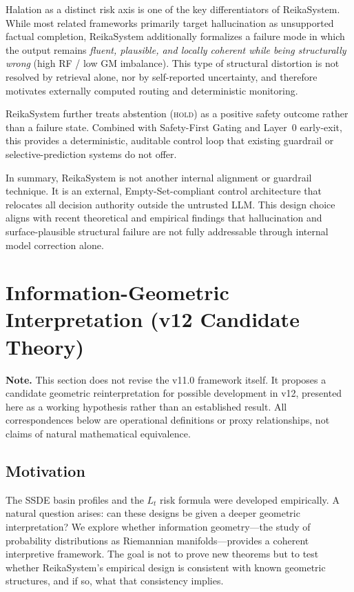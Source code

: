 \documentclass[11pt,a4paper]{article}
\begin{document}
Halation as a distinct risk axis is one of the key differentiators of ReikaSystem.
While most related frameworks primarily target hallucination as unsupported factual
completion, ReikaSystem additionally formalizes a failure mode in which the output
remains \emph{fluent, plausible, and locally coherent while being structurally wrong}
(high RF / low GM imbalance). This type of structural distortion is not resolved by
retrieval alone, nor by self-reported uncertainty, and therefore motivates externally
computed routing and deterministic monitoring.

ReikaSystem further treats abstention (\textsc{hold}) as a positive safety outcome
rather than a failure state. Combined with Safety-First Gating and Layer~0 early-exit,
this provides a deterministic, auditable control loop that existing guardrail or
selective-prediction systems do not offer.

In summary, ReikaSystem is not another internal alignment or guardrail technique.
It is an external, Empty-Set-compliant control architecture that relocates all decision
authority outside the untrusted LLM. This design choice aligns with recent theoretical
and empirical findings that hallucination and surface-plausible structural failure are
not fully addressable through internal model correction alone.

\section{Information-Geometric Interpretation (v12 Candidate Theory)}
\label{sec:infogeo}

\textbf{Note.}
This section does not revise the v11.0 framework itself.
It proposes a candidate geometric reinterpretation for possible development in v12,
presented here as a working hypothesis rather than an established result.
All correspondences below are operational definitions or proxy relationships,
not claims of natural mathematical equivalence.

\subsection{Motivation}

The SSDE basin profiles and the $L_t$ risk formula were developed empirically.
A natural question arises: can these designs be given a deeper geometric interpretation?
We explore whether information geometry---the study of probability distributions as
Riemannian manifolds---provides a coherent interpretive framework.
The goal is not to prove new theorems but to test whether ReikaSystem's empirical
design is consistent with known geometric structures, and if so, what that consistency implies.
\end{document}
